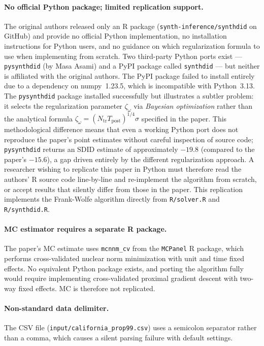 \documentclass[12pt]{article}
\begin{document}
\paragraph{No official Python package; limited replication support.}
The original authors released only an R package
(\texttt{synth-inference/synthdid} on GitHub) and provide no official Python
implementation, no installation instructions for Python users, and no guidance on
which regularization formula to use when implementing from scratch.
Two third-party Python ports exist --- \texttt{pysynthdid} (by Masa Asami)
and a PyPI package called \texttt{synthdid} --- but neither is affiliated
with the original authors.
The PyPI package failed to install entirely due to a dependency on numpy~1.23.5,
which is incompatible with Python~3.13.
The \texttt{pysynthdid} package installed successfully but illustrates a subtler
problem: it selects the regularization parameter $\zeta_\omega$ via
\emph{Bayesian optimization} rather than the analytical formula
$\zeta_\omega = (N_{\text{tr}} T_{\text{post}})^{1/4} \hat{\sigma}$
specified in the paper.
This methodological difference means that even a working Python port does not
reproduce the paper's point estimates without careful inspection of source code;
\texttt{pysynthdid} returns an SDID estimate of approximately $-19.8$
(compared to the paper's $-15.6$), a gap driven entirely by the different
regularization approach.
A researcher wishing to replicate this paper in Python must therefore read the
authors' R source code line-by-line and re-implement the algorithm from scratch,
or accept results that silently differ from those in the paper.
This replication implements the Frank-Wolfe algorithm directly from
\texttt{R/solver.R} and \texttt{R/synthdid.R}.

\paragraph{MC estimator requires a separate R package.}
The paper's MC estimate uses \texttt{mcnnm\_cv} from the \texttt{MCPanel} R package,
which performs cross-validated nuclear norm minimization with unit and time fixed effects.
No equivalent Python package exists, and porting the algorithm fully would require
implementing cross-validated proximal gradient descent with two-way fixed effects.
MC is therefore not replicated.

\paragraph{Non-standard data delimiter.}
The CSV file (\texttt{input/california\_prop99.csv}) uses a semicolon separator
rather than a comma, which causes a silent parsing failure with default settings.
\end{document}
